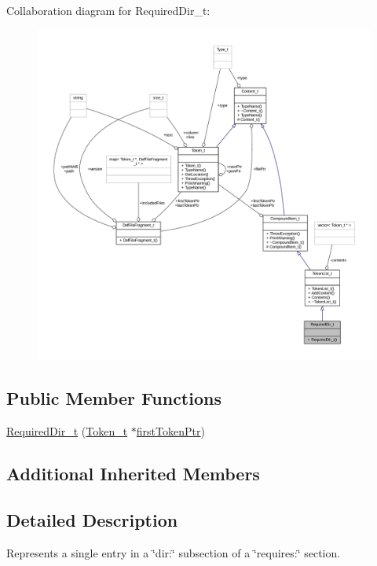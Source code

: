 Collaboration diagram for Required\+Dir\+\_\+t\+:
\nopagebreak
\begin{figure}[H]
\begin{center}
\leavevmode
\includegraphics[width=350pt]{struct_required_dir__t__coll__graph}
\end{center}
\end{figure}
\subsection*{Public Member Functions}
\begin{DoxyCompactItemize}
\item 
\hyperlink{struct_required_dir__t_a0d011a7fe8dc6cc76c223f07f5eb2e31}{Required\+Dir\+\_\+t} (\hyperlink{struct_token__t}{Token\+\_\+t} $\ast$\hyperlink{struct_compound_item__t_a4d95dc788120f627e332491589d20c5c}{first\+Token\+Ptr})
\end{DoxyCompactItemize}
\subsection*{Additional Inherited Members}


\subsection{Detailed Description}
Represents a single entry in a \char`\"{}dir\+:\char`\"{} subsection of a \char`\"{}requires\+:\char`\"{} section. 

